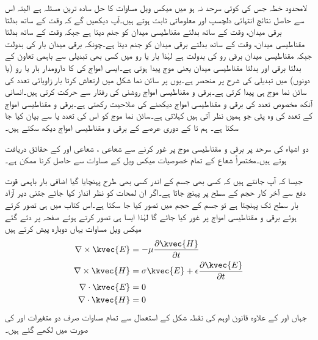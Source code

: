 لامحدود خطہ جس کی کوئی سرحد نہ ہو میں میکس ویل مساوات کا حل سادہ ترین مسئلہ ہے البتہ اس سے حاصل نتائج انتہائی دلچسپ اور معلوماتی ثابت ہوتے ہیں۔آپ دیکھیں گے کہ وقت کے ساتھ بدلتا برقی میدان، وقت کے ساتھ بدلتے مقناطیسی میدان کو جنم دیتا ہے جبکہ وقت کے ساتھ بدلتا مقناطیسی میدان، وقت کے ساتھ بدلتے برقی میدان کو جنم دیتا ہے۔چونکہ برقی میدان بار کی بدولت جبکہ مقناطیسی میدان برقی رو کی بدولت ہے لہٰذا بار یا رو میں کسی بھی تبدیلی سے  باہمی تعاون کے بدلتا برقی اور بدلتا مقناطیسی میدان یعنی  موج پیدا ہوتی ہے۔ایسی امواج کی  کا دارومدار بار یا رو (یا دونوں) میں تبدیلی کی شرح پر منحصر ہے۔یوں   پر سائن نما شکل میں ارتعاش کرتا بار  زاویائی تعدد کی سائن نما موج ہی پیدا کرتی ہے۔برقی و مقناطیسی امواج  روشنی کی رفتار سے حرکت کرتی ہیں۔انسانی آنکھ مخصوص تعدد کی برقی و مقناطیسی امواج دیکھنے کی صلاحیت رکھتی ہے۔برقی و مقناطیسی امواج کے تعدد کی وہ پٹی جو ہمیں نظر آتی ہیں  کہلاتی ہے۔سائن نما موج کو اس کی تعدد  یا   سے بیان کیا جا سکتا ہے۔ ہم  تا  کے دوری عرصے کے برقی و مقناطیسی امواج دیکھ سکتے ہیں۔

دو اشیاء کی سرحد پر برقی و مقناطیسی موج پر غور کرنے سے  شعاعی ، شعاعی  اور   کے حقائق دریافت ہوتے ہیں۔مختصراً شعاع کے تمام خصوصیات میکس ویل کے مساوات سے حاصل کرنا ممکن ہے۔

جیسا کہ آپ جانتے ہیں کہ کسی بھی جسم کے اندر کسی بھی طرح پہنچایا گیا اضافی بار باہمی قوت دفع سے آخر کار حجم کے سطح پر پہنچ جاتا ہے۔اگر ان لمحات کو نظر انداز کیا جائے جتنی دیر آزاد بار سطح تک پہنچتا ہے تو جسم کے حجم میں  تصور کیا جا سکتا ہے۔اس کتاب میں  ہی تصور کرتے ہوئے برقی و مقناطیسی امواج پر غور کیا جائے گا لہٰذا ایسا ہی تصور کرتے ہوئے صفحہ  پر دئے گئے میکس ویل مساوات یہاں دوبارہ پیش کرتے ہیں
\begin{align}
\nabla \times \kvec{E}&=-\mu \frac{\partial \kvec{H}}{\partial t}  \label{مساوات_موج_میکس_ویل_خالی_خلاء_الف}\\
\nabla \times \kvec{H}&=\sigma \kvec{E}+\epsilon \frac{\partial \kvec{E}}{\partial t}  \label{مساوات_موج_میکس_ویل_خالی_خلاء_ب}\\
\nabla \cdot \kvec{E}&=0 \label{مساوات_موج_میکس_ویل_خالی_خلاء_پ}\\
\nabla \cdot \kvec{H}&=0  \label{مساوات_موج_میکس_ویل_خالی_خلاء_ت}
\end{align}
جہاں  اور  کے علاوہ قانون اوہم کی نقطہ شکل  کے  استعمال سے تمام مساوات صرف دو متغیرات  اور  کی صورت میں لکھے گئے ہیں۔

